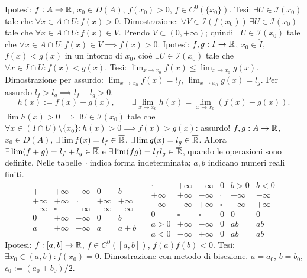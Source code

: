 Ipotesi: $f:A\to\mathbb R$, $x_0\in D(A)$, $f(x_0)>0$, $f\in C^0(\{x_0\})$.
Tesi: $\exists U\in\mathcal I(x_0)$ tale che $\forall x\in A\cap U:f(x)>0$.
Dimostrazione: $\forall V\in\mathcal I(f(x_0))\ \exists U\in\mathcal I(x_0)$ tale che $\forall x\in A\cap U:f(x)\in V$.
Prendo $V\subset(0,+\infty)$; quindi $\exists U\in\mathcal I(x_0)$ tale che $\forall x\in A\cap U:f(x)\in V\implies f(x)>0$.
Ipotesi: $f,g:I\to\mathbb R$, $x_0\in\mathring I$, $f(x)<g(x)$ in un intorno di $x_0$, cioè $\exists U\in\mathcal I(x_0)$ tale che $\forall x\in I\cap U:f(x)<g(x)$.
Tesi: $\lim_{x\to x_0}f(x)\le\lim_{x\to x_0}g(x)$.
Dimostrazione per assurdo: $\lim_{x\to x_0}f(x)=l_f$, $\lim_{x\to x_0}g(x)=l_g$.
Per assurdo $l_f>l_g\implies l_f-l_g>0$.
\[h(x):=f(x)-g(x),\qquad\exists\lim_{x\to x_0}h(x)=\lim_{x\to x_0}(f(x)-g(x)).\]
$\lim h(x)>0\implies\exists U\in\mathcal I(x_0)$ tale che $\forall x\in(I\cap U)\setminus\{x_0\}:h(x)>0\implies f(x)>g(x)$: assurdo!
$f,g:A\to\mathbb R$, $x_0\in D(A)$, $\exists\lim f(x)=l_f\in\overline{\mathbb R}$, $\exists\lim g(x)=l_g\in\overline{\mathbb R}$.
Allora $\exists\lim(f+g)=l_f+l_g\in\overline{\mathbb R}$ e $\exists\lim(fg)=l_fl_g\in\overline{\mathbb R}$, quando le operazioni sono definite.
Nelle tabelle $\square$ indica forma indeterminata; $a,b$ indicano numeri reali finiti.
\[\begin{array}{c|rrrr}+&+\infty&-\infty&0&b\\\hline+\infty&+\infty&\square&+\infty&+\infty\\-\infty&\square&-\infty&-\infty&-\infty\\0&+\infty&-\infty&0&b\\a&+\infty&-\infty&a&a+b\end{array}\quad\begin{array}{c|rrrrr}\cdot&+\infty&-\infty&0&b>0&b<0\\\hline+\infty&+\infty&-\infty&\square&+\infty&-\infty\\-\infty&-\infty&+\infty&\square&-\infty&+\infty\\0&\square&\square&0&0&0\\a>0&+\infty&-\infty&0&ab&ab\\a<0&-\infty&+\infty&0&ab&ab\end{array}\]
Ipotesi: $f:[a,b]\to\mathbb R$, $f\in C^0([a,b])$, $f(a)f(b)<0$.
Tesi: $\exists x_0\in(a,b):f(x_0)=0$.
Dimostrazione con metodo di bisezione. $a=a_0$, $b=b_0$, $c_0:=(a_0+b_0)/2$.
